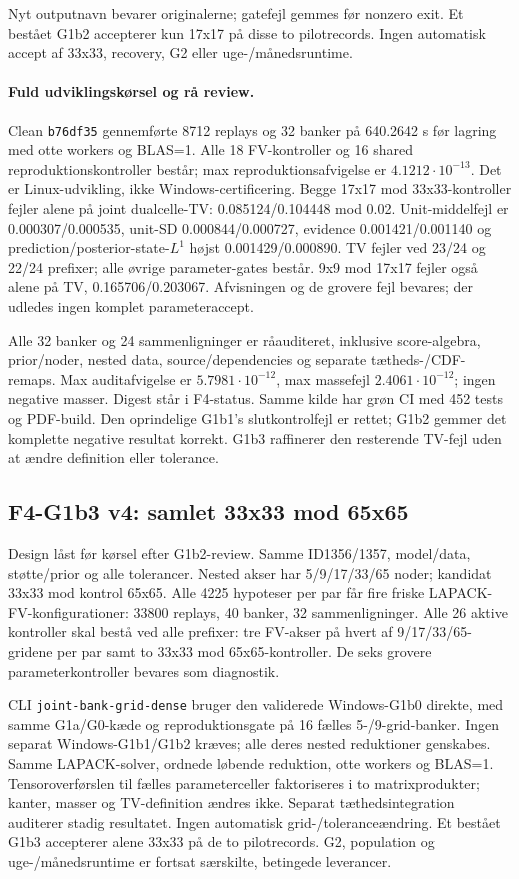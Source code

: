 Nyt outputnavn bevarer originalerne; gatefejl gemmes før nonzero exit.
Et bestået G1b2 accepterer kun 17x17 på disse to pilotrecords. Ingen
automatisk accept af 33x33, recovery, G2 eller uge-/månedsruntime.

\paragraph{Fuld udviklingskørsel og rå review.}
Clean \texttt{b76df35} gennemførte 8712 replays og 32 banker på
640.2642 s før lagring med otte workers og BLAS=1. Alle 18 FV-kontroller
og 16 shared reproduktionskontroller består; max reproduktionsafvigelse er
\(4.1212\cdot10^{-13}\). Det er Linux-udvikling, ikke Windows-certificering.
Begge 17x17 mod 33x33-kontroller fejler alene på joint dualcelle-TV:
0.085124/0.104448 mod 0.02. Unit-middelfejl er 0.000307/0.000535,
unit-SD 0.000844/0.000727, evidence 0.001421/0.001140 og
prediction/posterior-state-\(L^1\) højst 0.001429/0.000890.
TV fejler ved 23/24 og 22/24 prefixer; alle øvrige parameter-gates består.
9x9 mod 17x17 fejler også alene på TV, 0.165706/0.203067.
Afvisningen og de grovere fejl bevares; der udledes ingen komplet parameteraccept.

Alle 32 banker og 24 sammenligninger er råauditeret, inklusive score-algebra,
prior/noder, nested data, source/dependencies og separate tætheds-/CDF-remaps.
Max auditafvigelse er \(5.7981\cdot10^{-12}\), max massefejl
\(2.4061\cdot10^{-12}\); ingen negative masser. Digest står i F4-status.
Samme kilde har grøn CI med 452 tests og PDF-build. Den oprindelige G1b1's
slutkontrolfejl er rettet; G1b2 gemmer det komplette negative resultat korrekt.
G1b3 raffinerer den resterende TV-fejl uden at ændre definition eller tolerance.

\subsection{F4-G1b3 v4: samlet 33x33 mod 65x65}
Design låst før kørsel efter G1b2-review. Samme ID1356/1357, model/data,
støtte/prior og alle tolerancer. Nested akser har 5/9/17/33/65 noder;
kandidat 33x33 mod kontrol 65x65. Alle 4225 hypoteser per par får fire
friske LAPACK-FV-konfigurationer: 33800 replays, 40 banker, 32 sammenligninger.
Alle 26 aktive kontroller skal bestå ved alle prefixer: tre FV-akser på hvert
af 9/17/33/65-gridene per par samt to 33x33 mod 65x65-kontroller.
De seks grovere parameterkontroller bevares som diagnostik.

CLI \texttt{joint-bank-grid-dense} bruger den validerede Windows-G1b0 direkte,
med samme G1a/G0-kæde og reproduktionsgate på 16 fælles 5-/9-grid-banker.
Ingen separat Windows-G1b1/G1b2 kræves; alle deres nested reduktioner genskabes.
Samme LAPACK-solver, ordnede løbende reduktion, otte workers og BLAS=1.
Tensoroverførslen til fælles parameterceller faktoriseres i to matrixprodukter;
kanter, masser og TV-definition ændres ikke. Separat tæthedsintegration
auditerer stadig resultatet. Ingen automatisk grid-/toleranceændring.
Et bestået G1b3 accepterer alene 33x33 på de to pilotrecords. G2, population
og uge-/månedsruntime er fortsat særskilte, betingede leverancer.


